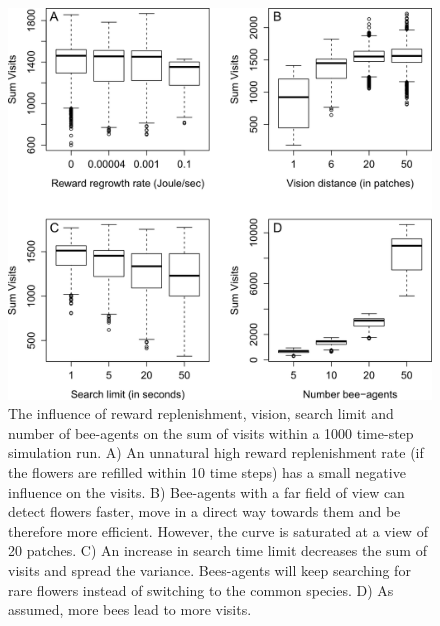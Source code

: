 \clearpage

\begin{figure} [h!]
	\centering
	\includegraphics[width=14cm]{Images/SA_SUM}
	\caption{The influence of reward replenishment, vision, search limit and number of bee-agents on the sum of visits within a 1000 time-step simulation run. A) An unnatural high reward replenishment rate (if the flowers are refilled within 10 time steps) has a small negative influence on the visits.  B) Bee-agents with a far field of view can detect flowers faster, move in a direct way towards them and be therefore more efficient. However, the curve is saturated at a view of 20 patches. C) An increase in search time limit decreases the sum of visits and spread the variance. Bees-agents will keep searching for rare flowers instead of switching to the common species. D) As assumed, more bees lead to more visits.} 
	\label{fig:SA_SUM}
\end{figure}

\clearpage

